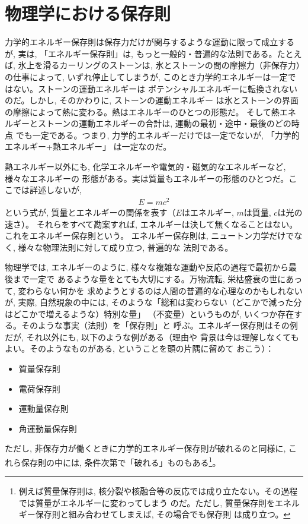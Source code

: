 \vspace{0.4cm}


\section{物理学における保存則}

力学的エネルギー保存則は保存力だけが関与するような運動に限って成立するが, 実は, 
「エネルギー保存則」は, もっと一般的・普遍的な法則である。たとえば, 
氷上を滑るカーリングのストーンは, 氷とストーンの間の摩擦力（非保存力）の仕事によって, 
いずれ停止してしまうが, このとき力学的エネルギーは一定ではない。ストーンの運動エネルギーは
ポテンシャルエネルギーに転換されないのだ。しかし, そのかわりに, ストーンの運動エネルギー
は氷とストーンの界面の摩擦によって熱に変わる。熱はエネルギーのひとつの形態だ。
そして熱エネルギーとストーンの運動エネルギーの合計は, 運動の最初・途中・最後のどの時点
でも一定である。つまり, 力学的エネルギーだけでは一定でないが, 「力学的エネルギー+熱エネルギー」
は一定なのだ。

熱エネルギー以外にも, 化学エネルギーや電気的・磁気的なエネルギーなど, 様々なエネルギーの
形態がある。実は質量もエネルギーの形態のひとつだ。ここでは詳述しないが, 
\begin{eqnarray}E=mc^2\end{eqnarray}
という式が, 質量とエネルギーの関係を表す（$E$はエネルギー, $m$は質量, $c$は光の速さ）。
それらをすべて勘案すれば, エネルギーは決して無くなることはない。これをエネルギー保存則という。
エネルギー保存則は, ニュートン力学だけでなく, 様々な物理法則に対して成り立つ, 普遍的な
法則である。

物理学では, エネルギーのように, 様々な複雑な運動や反応の過程で最初から最後まで一定で
あるような量をとても大切にする。万物流転, 栄枯盛衰の世にあって, 変わらない何かを
求めようとするのは人間の普遍的な心理なのかもしれないが, 実際, 自然現象の中には, 
そのような「総和は変わらない（どこかで減った分はどこかで増えるような）特別な量」
（不変量）というものが, いくつか存在する。そのような事実（法則）を「保存則」と
呼ぶ。エネルギー保存則はその例だが, それ以外にも, 以下のような例がある（理由や
背景は今は理解しなくてもよい。そのようなものがある, ということを頭の片隅に留めて
おこう）：
\begin{itemize}
\item 質量保存則
\item 電荷保存則
\item 運動量保存則
\item 角運動量保存則
\end{itemize}
ただし, 非保存力が働くときに力学的エネルギー保存則が破れるのと同様に, 
これら保存則の中には, 条件次第で「破れる」ものもある\footnote{例えば質量保存則は, 
核分裂や核融合等の反応では成り立たない。その過程では質量がエネルギーに変わってしまう
のだ。ただし, 質量保存則をエネルギー保存則と組み合わせてしまえば, その場合でも保存則
は成り立つ。}。


